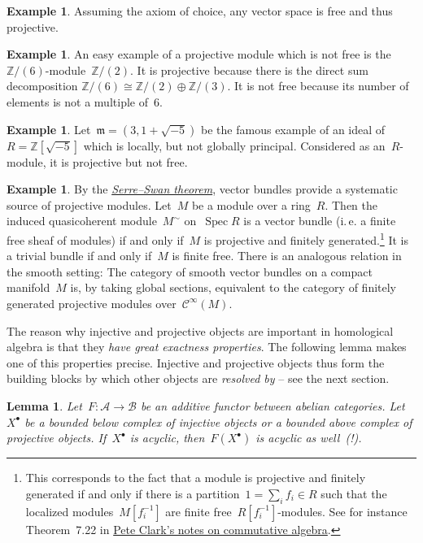 \documentclass{amsart}
\makeatletter
\theoremstyle{definition}
\newtheorem{ex}[defn]{Example}
\theoremstyle{plain}
\newtheorem{lemma}[defn]{Lemma}
\theoremstyle{remark}
\newcommand{\ZZ}{\mathbb{Z}}
\newcommand{\A}{\mathcal{A}}
\newcommand{\B}{\mathcal{B}}
\newcommand{\C}{\mathcal{C}}
\newcommand{\mmm}{\mathfrak{m}}
\DeclareMathOperator{\Spec}{Spec}
\newcommand{\?}{\,{:}\,}
\renewcommand{\_}{\mathpunct{.}\,}
\newcommand{\ie}{i.\,e.\@\xspace}
\makeatother
\begin{document}
\begin{ex}Assuming the axiom of choice, any vector space is free and thus
projective.\end{ex}

\begin{ex}An easy example of a projective module which is not free is
the~$\ZZ/(6)$-module~$\ZZ/(2)$. It is projective because there is the direct sum
decomposition $\ZZ/(6) \cong \ZZ/(2) \oplus \ZZ/(3)$. It is not free because
its number of elements is not a multiple of~$6$.\end{ex}

\begin{ex}Let~$\mmm = (3, 1 + \sqrt{-5})$ be the famous example of an ideal
of~$R = \ZZ[\sqrt{-5}]$ which is locally, but not globally principal.
Considered as an~$R$-module, it is projective but not free.\end{ex}

\begin{ex}By the
\href{http://ncatlab.org/nlab/show/Serre-Swan+theorem}{\emph{Serre--Swan
theorem}}, vector bundles provide a systematic source of projective modules.
Let~$M$ be a module over a ring~$R$. Then the induced quasicoherent
module~$M^\sim$ on~$\Spec R$ is a vector bundle (\ie a finite free sheaf of
modules) if and only if~$M$ is projective and finitely generated.\footnote{This
corresponds to the fact that a module is projective and finitely generated if
and only if there is a partition~$1 = \sum_i f_i \in R$ such that the localized
modules~$M[f_i^{-1}]$ are finite free~$R[f_i^{-1}]$-modules. See for instance
Theorem~7.22 in \href{http://math.uga.edu/~pete/integral.pdf}{Pete Clark's
notes on commutative algebra}.}
It is a
trivial bundle if and only if~$M$ is finite free. There is an analogous
relation in the smooth setting: The category of smooth vector bundles on a
compact manifold~$M$ is, by taking global sections, equivalent to the category
of finitely generated projective modules over~$\C^\infty(M)$.
\end{ex}

The reason why injective and projective objects are important in homological
algebra is that they \emph{have great exactness properties}. The following
lemma makes one of this properties precise. Injective and projective objects
thus form the building blocks by which other objects are \emph{resolved by} --
see the next section.

\begin{lemma}Let~$F : \A \to \B$ be an additive functor between abelian
categories. Let~$X^\bullet$ be a bounded below complex of injective objects or
a bounded above complex of projective objects. If~$X^\bullet$ is acyclic,
then~$F(X^\bullet)$ is acyclic as well~(!).\end{lemma}
\end{document}
